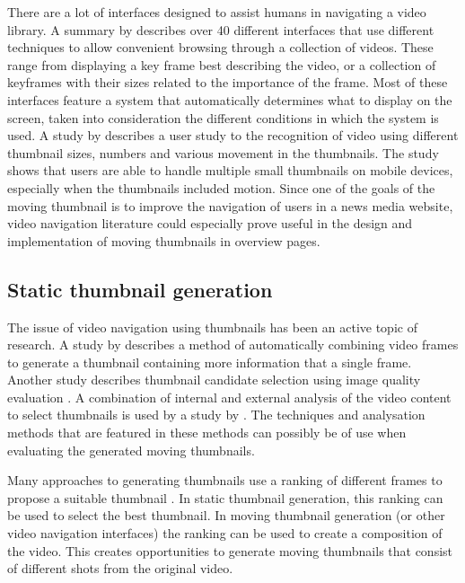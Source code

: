 \documentclass{../resources/sig-alternate-05-2015}
\begin{document}
There are a lot of interfaces designed to assist humans in navigating a video library. A summary by \textcite{Schoeffmann:2010iw} describes over 40 different interfaces that use different techniques to allow convenient browsing through a collection of videos. These range from displaying a key frame best describing the video, or a collection of keyframes with their sizes related to the importance of the frame. Most of these interfaces feature a system that automatically determines what to display on the screen, taken into consideration the different conditions in which the system is used. A study by \textcite{Hurst:2011jx} describes a user study to the recognition of video using different thumbnail sizes, numbers and various movement in the thumbnails. The study shows that users are able to handle multiple small thumbnails on mobile devices, especially when the thumbnails included motion. Since one of the goals of the moving thumbnail is to improve the navigation of users in a news media website, video navigation literature could especially prove useful in the design and implementation of moving thumbnails in overview pages.

\subsection{Static thumbnail generation}
\label{static thumbnails}
The issue of video navigation using thumbnails has been an active topic of research. A \citeyear{Kim:2015co} study by \textcite{Kim:2015co} describes a method of automatically combining video frames to generate a thumbnail containing more information that a single frame. Another study describes thumbnail candidate selection using image quality evaluation \cite{Zhang:2014jg}. A combination of internal and external analysis of the video content to select thumbnails is used by a study by \textcite{Liu:2015ux}. The techniques and analysation methods that are featured in these methods can possibly be of use when evaluating the generated moving thumbnails.

Many approaches to generating thumbnails use a ranking of different frames to propose a suitable thumbnail \cite{Choi:2015gm,Zhang:2012eo,Gao:2009dx}. In static thumbnail generation, this ranking can be used to select the best thumbnail. In moving thumbnail generation (or other video navigation interfaces) the ranking can be used to create a composition of the video. This creates opportunities to generate moving thumbnails that consist of different shots from the original video.
\end{document}
